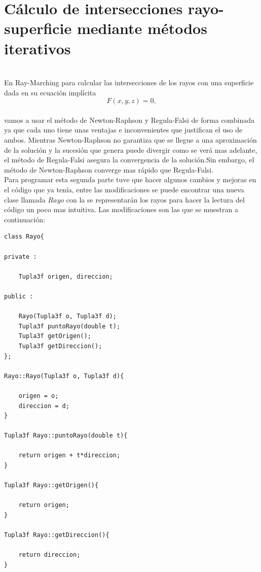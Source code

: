 \chapter{Cálculo de intersecciones rayo-superficie mediante métodos iterativos}

${ }$\\

En Ray-Marching para calcular las intersecciones de los rayos con una superficie dada en su ecuación implícita
${ }$\\
\[
	F(x,y,z) = 0,
\]
${ }$\\
vamos a usar el método de Newton-Raphson y Regula-Falsi de forma combinada ya que cada uno tiene unas ventajas e inconvenientes que justifican el uso de ambos. Mientras Newton-Raphson no garantiza que se llegue a una aproximación de la solución y la sucesión que genera puede divergir como se verá mas adelante, el método de Regula-Falsi asegura la convergencia de la solución.Sin embargo, el método de Newton-Raphson converge mas rápido que Regula-Falsi.
${ }$\\

Para programar esta segunda parte tuve que hacer algunos cambios y mejoras en el código que ya tenía, entre las modificaciones se puede encontrar una nueva clase llamada $Rayo$ con la se representarán los rayos para hacer la lectura del código un poco mas intuitiva. Las modificaciones son las que se muestran a continuación:


\begin{lstlisting}[style=Consola]
class Rayo{
	
private :
	
	Tupla3f origen, direccion;
	
public :
	
	Rayo(Tupla3f o, Tupla3f d);
	Tupla3f puntoRayo(double t);
	Tupla3f getOrigen();
	Tupla3f getDireccion();
};
	
Rayo::Rayo(Tupla3f o, Tupla3f d){

	origen = o;
	direccion = d;
}
	
Tupla3f Rayo::puntoRayo(double t){

	return origen + t*direccion;
}
	
Tupla3f Rayo::getOrigen(){

	return origen;
}
	
Tupla3f Rayo::getDireccion(){

	return direccion;
}
\end{lstlisting}
${ }$\\



